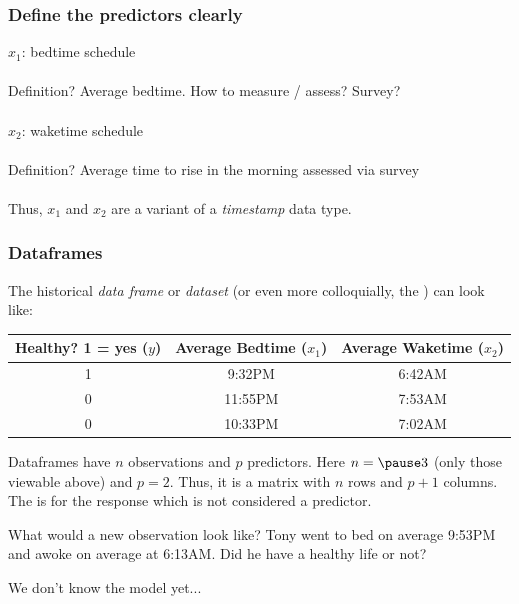 \documentclass[handout]{beamer}
\begin{document}
\begin{frame}\frametitle{Define the predictors clearly}

$x_1$: bedtime schedule \\~\\

Definition? \pause Average bedtime. \pause How to measure / assess? Survey? \\~\\	



$x_2$: waketime schedule \\~\\	

Definition? \pause Average time to rise in the morning assessed via survey\\~\\	

Thus, $x_1$ and $x_2$ are a variant of a \textit{timestamp} data type.

\end{frame}

\begin{frame}\frametitle{Dataframes}

\small
The historical \textit{data frame} or \textit{dataset} (or even more colloquially, the ) can look like:

\begin{table}
\centering
\small
\begin{tabular}{ccc}
Healthy? 1 = yes ($y$) & Average Bedtime ($x_1$) & Average Waketime ($x_2$) \\ \hline
1 & 9:32PM & 6:42AM \\
0 & 11:55PM & 7:53AM \\
0 & 10:33PM & 7:02AM
\end{tabular}
\end{table} \pause 

Dataframes have $n$ observations and $p$ predictors. Here $n = \pause 3$ (only those viewable above) and $p = 2$. Thus, it is a matrix with $n$ rows and $p + 1$ columns. The  is for the response which is not considered a predictor. \\ \pause 

What would a new observation look like? Tony went to bed on average 9:53PM and awoke on average at 6:13AM. Did he have a healthy life or not? \pause 

We don't know the model yet...
	
\end{frame}
\end{document}
